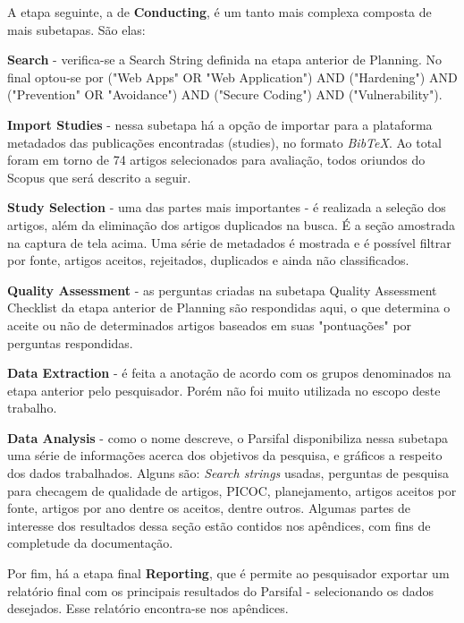 A etapa seguinte, a de \textbf{Conducting}, é um tanto mais complexa composta de mais subetapas. São elas:
\begin{alineas}
\item \textbf{Search} - verifica-se a Search String definida na etapa anterior de Planning. No final optou-se por ("Web Apps" OR "Web Application") AND ("Hardening") AND ("Prevention" OR "Avoidance") AND ("Secure Coding") AND ("Vulnerability").

\item \textbf{Import Studies} - nessa subetapa há a opção de importar para a plataforma metadados das publicações encontradas (studies), no formato \textit{BibTeX}. Ao total foram em torno de 74 artigos selecionados para avaliação, todos oriundos do Scopus que será descrito a seguir.

\item \textbf{Study Selection} - uma das partes mais importantes - é realizada a seleção dos artigos, além da eliminação dos artigos duplicados na busca. É a seção amostrada na captura de tela acima. Uma série de metadados é mostrada e é possível filtrar por fonte, artigos aceitos, rejeitados, duplicados e ainda não classificados.

\item \textbf{Quality Assessment} - as perguntas criadas na subetapa Quality Assessment Checklist da etapa anterior de Planning são respondidas aqui, o que determina o aceite ou não de determinados artigos baseados em suas "pontuações" por perguntas respondidas.

\item \textbf{Data Extraction} - é feita a anotação de acordo com os grupos denominados na etapa anterior pelo pesquisador. Porém não foi muito utilizada no escopo deste trabalho.

\item \textbf{Data Analysis} - como o nome descreve, o Parsifal disponibiliza nessa subetapa uma série de informações acerca dos objetivos da pesquisa, e gráficos a respeito dos dados trabalhados. Alguns são: \textit{Search strings} usadas, perguntas de pesquisa para checagem de qualidade de artigos, PICOC, planejamento, artigos aceitos por fonte, artigos por ano dentre os aceitos, dentre outros. Algumas partes de interesse dos resultados dessa seção estão contidos nos apêndices, com fins de completude da documentação.

\end{alineas}

Por fim, há a etapa final \textbf{Reporting}, que é permite ao pesquisador exportar um relatório final com os principais resultados do Parsifal - selecionando os dados desejados. Esse relatório encontra-se nos apêndices.

